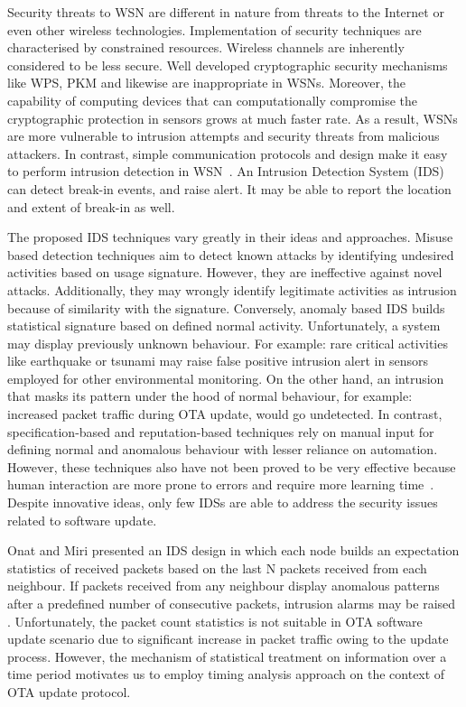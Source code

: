 \documentclass[conference]{IEEEtran}
\begin{document}
Security threats to WSN are different in nature from threats to the Internet or even other wireless technologies. %
Implementation of security techniques are characterised by constrained resources.
Wireless channels are inherently considered to be less secure.
Well developed cryptographic security mechanisms like WPS, PKM and likewise are inappropriate in WSNs.
Moreover, the capability of computing devices that can computationally compromise the cryptographic protection in sensors grows at much faster rate.
As a result, WSNs are more vulnerable to intrusion attempts and security threats from malicious attackers.
In contrast, simple communication protocols and design make it easy to perform intrusion detection in WSN~\cite{quing09}.
An Intrusion Detection System (IDS) can detect  break-in events, and raise alert.%
It may be able to report the location and extent of break-in as well.


The proposed IDS techniques vary greatly in their ideas and approaches.
Misuse based  detection  techniques aim to detect known attacks by identifying undesired activities based on usage signature.
However, they are ineffective against novel attacks.
Additionally, they may wrongly identify legitimate activities as intrusion because of similarity with the signature.
Conversely, anomaly based IDS builds statistical signature based on defined normal activity.
Unfortunately, a system may display previously unknown behaviour.
For example: rare critical activities like earthquake or tsunami may raise false positive intrusion alert in sensors employed for other environmental monitoring.
On the other hand, an intrusion that masks its pattern under the hood of normal behaviour, for example: increased packet traffic during OTA update, would go undetected.
In contrast, specification-based and reputation-based techniques rely on manual input for defining normal and anomalous behaviour with lesser reliance on automation.
However, these techniques also have not been proved to be very effective because human interaction are more prone to errors and require more learning time~\cite{quing09}. 
Despite innovative ideas, only few IDSs are able to address the security issues related to software update.

Onat and Miri presented an IDS design in which each node builds an expectation statistics of received packets based on the last N packets received from each neighbour.
If packets received from any neighbour display anomalous patterns after a predefined number of consecutive packets, intrusion alarms may be raised \cite{1512911}.
Unfortunately, the  packet count statistics is not suitable in OTA software update scenario due to significant increase in packet traffic owing to the update process. 
However, the mechanism of statistical treatment on information over a time period motivates us to employ timing analysis approach on the context of OTA update protocol.
\end{document}
